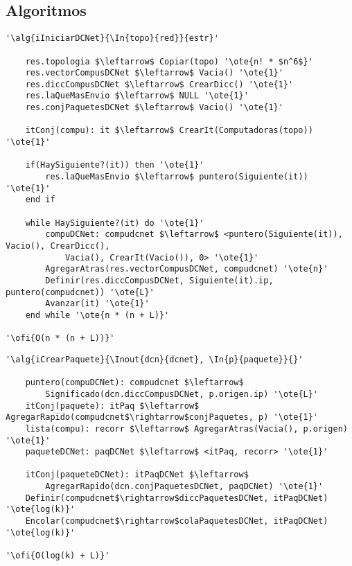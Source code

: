 \subsection{Algoritmos}

\lstset{style=alg}

\begin{lstlisting}[mathescape]
'\alg{iIniciarDCNet}{\In{topo}{red}}{estr}'

    res.topologia $\leftarrow$ Copiar(topo) '\ote{n! * $n^6$}'
    res.vectorCompusDCNet $\leftarrow$ Vacia() '\ote{1}'
    res.diccCompusDCNet $\leftarrow$ CrearDicc() '\ote{1}'
    res.laQueMasEnvio $\leftarrow$ NULL '\ote{1}'
    res.conjPaquetesDCNet $\leftarrow$ Vacio() '\ote{1}'

    itConj(compu): it $\leftarrow$ CrearIt(Computadoras(topo)) '\ote{1}'

    if(HaySiguiente?(it)) then '\ote{1}'
    	res.laQueMasEnvio $\leftarrow$ puntero(Siguiente(it)) '\ote{1}'
    end if

    while HaySiguiente?(it) do '\ote{1}'
    	compuDCNet: compudcnet $\leftarrow$ <puntero(Siguiente(it)), Vacio(), CrearDicc(),
    		Vacia(), CrearIt(Vacio()), 0> '\ote{1}'
    	AgregarAtras(res.vectorCompusDCNet, compudcnet) '\ote{n}'
    	Definir(res.diccCompusDCNet, Siguiente(it).ip, puntero(compudcnet)) '\ote{L}'
    	Avanzar(it) '\ote{1}'
    end while '\ote{n * (n + L)}'

'\ofi{O(n * (n + L))}'
\end{lstlisting}

\begin{lstlisting}[mathescape]
'\alg{iCrearPaquete}{\Inout{dcn}{dcnet}, \In{p}{paquete}}{}'

	puntero(compuDCNet): compudcnet $\leftarrow$
		Significado(dcn.diccCompusDCNet, p.origen.ip) '\ote{L}'
	itConj(paquete): itPaq $\leftarrow$ AgregarRapido(compudcnet$\rightarrow$conjPaquetes, p) '\ote{1}'
	lista(compu): recorr $\leftarrow$ AgregarAtras(Vacia(), p.origen) '\ote{1}'
	paqueteDCNet: paqDCNet $\leftarrow$ <itPaq, recorr> '\ote{1}'

	itConj(paqueteDCNet): itPaqDCNet $\leftarrow$
		AgregarRapido(dcn.conjPaquetesDCNet, paqDCNet) '\ote{1}'
	Definir(compudcnet$\rightarrow$diccPaquetesDCNet, itPaqDCNet) '\ote{log(k)}'
	Encolar(compudcnet$\rightarrow$colaPaquetesDCNet, itPaqDCNet) '\ote{log(k)}'

'\ofi{O(log(k) + L)}'
\end{lstlisting}


